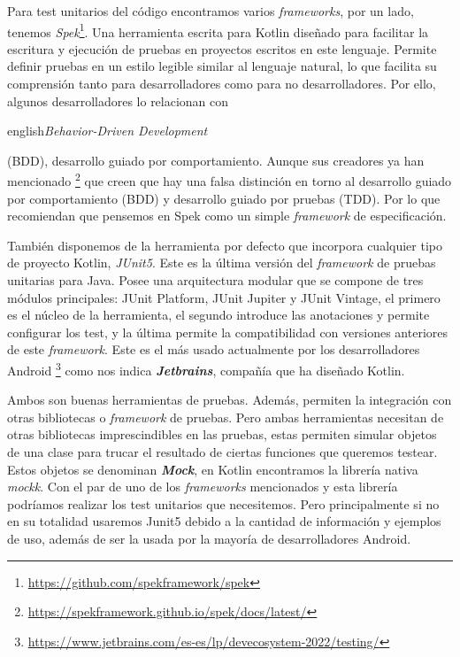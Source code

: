 Para test unitarios del código encontramos varios \textit{frameworks}, por un lado, tenemos 
\textit{Spek}\footnote{\url{https://github.com/spekframework/spek}}. Una herramienta escrita para 
Kotlin diseñado para facilitar la escritura y ejecución de pruebas en proyectos escritos en este 
lenguaje. Permite definir pruebas en un estilo legible similar al lenguaje natural, lo que facilita 
su comprensión tanto para desarrolladores como para no desarrolladores. Por ello, algunos 
desarrolladores lo relacionan con \begin{otherlanguage}
{english}\textit{Behavior-Driven Development}\end{otherlanguage} (BDD), desarrollo guiado por 
comportamiento. Aunque sus creadores ya han mencionado 
\footnote{\url{https://spekframework.github.io/spek/docs/latest/}} que creen que hay una falsa 
distinción en torno al desarrollo guiado por comportamiento (BDD) y desarrollo guiado por pruebas 
(TDD). Por lo que recomiendan que pensemos en Spek como un simple \textit{framework} de 
especificación.

También disponemos de la herramienta por defecto que incorpora cualquier tipo de proyecto Kotlin, 
\textit{JUnit5}. Este es la última versión del \textit{framework} de pruebas unitarias para Java. Posee 
una arquitectura modular que se compone de tres módulos principales: JUnit Platform, JUnit Jupiter y 
JUnit Vintage, el primero es el núcleo de la herramienta, el segundo introduce las anotaciones y 
permite configurar los test, y la última permite la compatibilidad con versiones anteriores de este 
\textit{framework}. Este es el más usado actualmente por los desarrolladores Android 
\footnote{\url{https://www.jetbrains.com/es-es/lp/devecosystem-2022/testing/}} como nos indica 
\textbf{\textit{Jetbrains}}, compañía que ha diseñado Kotlin.

Ambos son buenas herramientas de pruebas. Además, permiten la integración con otras bibliotecas o 
\textit{framework} de pruebas. Pero ambas herramientas necesitan de otras bibliotecas imprescindibles 
en las pruebas, estas permiten simular objetos de una clase para trucar el resultado de ciertas 
funciones que queremos testear. Estos objetos se denominan \textbf{\textit{Mock}}, en Kotlin 
encontramos la librería nativa \textit{mockk}. Con el par de uno de los \textit{frameworks} 
mencionados y esta librería podríamos realizar los test unitarios que necesitemos. Pero principalmente 
si no en su totalidad usaremos Junit5 debido a la cantidad de información y ejemplos de uso, además de 
ser la usada por la mayoría de desarrolladores Android.


